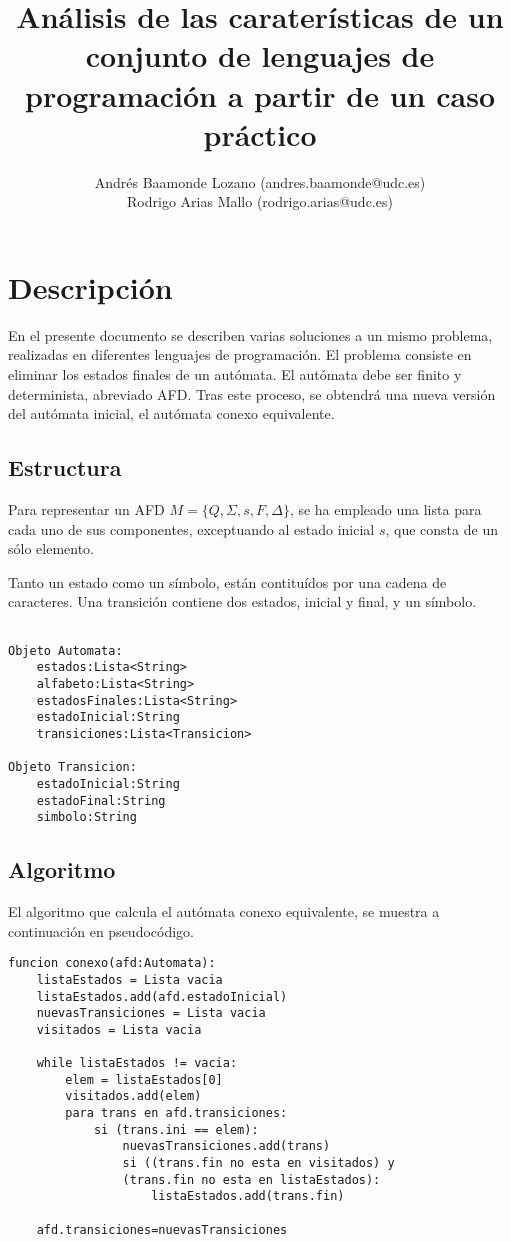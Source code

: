 \documentclass[12pt,a4paper]{article}
\title{Análisis de las caraterísticas de un conjunto de lenguajes de
programación a partir de un caso práctico}
\author{Andrés Baamonde Lozano (andres.baamonde@udc.es)\\
	Rodrigo Arias Mallo (rodrigo.arias@udc.es)}
\begin{document}
\maketitle


\section{Descripción}

En el presente documento se describen varias soluciones a un mismo problema,
realizadas en diferentes lenguajes de programación. El problema consiste en
eliminar los estados finales de un autómata. El autómata debe ser finito y
determinista, abreviado AFD. Tras este proceso, se obtendrá una nueva versión
del autómata inicial, el autómata conexo equivalente.  

\subsection{Estructura}

Para representar un AFD $M = \{ Q, \Sigma, s, F, \Delta \} $, se ha empleado una 
lista para cada uno de sus componentes, exceptuando al estado inicial $s$, que 
consta de un sólo elemento.

Tanto un estado como un símbolo, están contituídos por una cadena de caracteres.  
Una transición contiene dos estados, inicial y final, y un símbolo.

\begin{lstlisting}

Objeto Automata:
	estados:Lista<String>
	alfabeto:Lista<String>
	estadosFinales:Lista<String>
	estadoInicial:String
	transiciones:Lista<Transicion>

Objeto Transicion:
	estadoInicial:String
	estadoFinal:String
	simbolo:String

\end{lstlisting}

\subsection{Algoritmo}
El algoritmo que calcula el autómata conexo equivalente, se muestra a 
continuación en pseudocódigo.

\begin{lstlisting}
funcion conexo(afd:Automata):
	listaEstados = Lista vacia
	listaEstados.add(afd.estadoInicial)
	nuevasTransiciones = Lista vacia
	visitados = Lista vacia

	while listaEstados != vacia:
		elem = listaEstados[0]
		visitados.add(elem)
		para trans en afd.transiciones:
			si (trans.ini == elem):
				nuevasTransiciones.add(trans)
				si ((trans.fin no esta en visitados) y
				(trans.fin no esta en listaEstados):
					listaEstados.add(trans.fin)
					
	afd.transiciones=nuevasTransiciones

\end{lstlisting}
\end{document}
